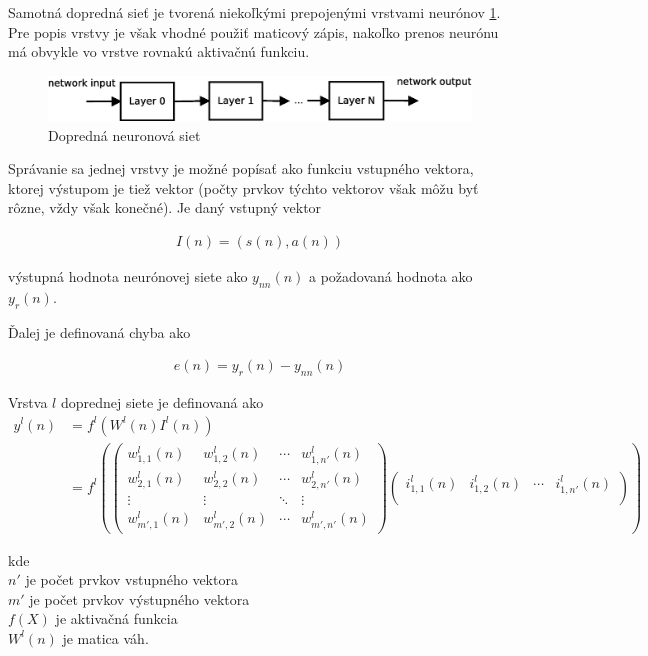 Samotná dopredná sieť je tvorená niekoľkými prepojenými vrstvami neurónov \ref{img:ffnn}.
Pre popis vrstvy je však vhodné použiť maticový zápis, nakoľko prenos neurónu má
obvykle vo vrstve rovnakú aktivačnú funkciu.

\begin{figure}[!htb]
\center
\includegraphics[scale=.6]{../diagrams/neural_layers.eps}
\caption{Dopredná neuronová siet}
\label{img:ffnn}
\end{figure}

Správanie sa jednej vrstvy je možné popísať ako funkciu vstupného vektora,
ktorej výstupom je tiež vektor (počty prvkov týchto vektorov však môžu byť rôzne,
vždy však konečné).
Je daný vstupný vektor

\begin{align}
I(n) = (s(n), a(n))
\label{eq:nn_input_vector}
\end{align}

výstupná hodnota neurónovej siete ako $y_{nn}(n)$ a požadovaná hodnota ako $y_{r}(n)$.

Ďalej je definovaná chyba ako

\begin{align}
e(n) = y_{r}(n) - y_{nn}(n)
\label{eq:nn_error}
\end{align}

Vrstva $l$ doprednej siete je definovaná ako
\begin{align}
y^l(n) &= f^l\left(W^l(n)I^l(n)\right) \nonumber \\
 &= f^l\left(
 \begin{pmatrix}
  w^l_{1,1}(n) & w^l_{1,2}(n) & \cdots & w^l_{1,n'}(n) \\
  w^l_{2,1}(n) & w^l_{2,2}(n) & \cdots & w^l_{2,n'}(n) \\
  \vdots  & \vdots  & \ddots & \vdots  \\
  w^l_{m',1}(n)  & w^l_{m',2}(n)  & \cdots & w^l_{m',n'}(n)
 \end{pmatrix}
 \begin{pmatrix}
  i^l_{1,1}(n) & i^l_{1,2}(n) & \cdots & i^l_{1,n'}(n) \\
 \end{pmatrix}
 \right)
 \label{eq:nn_layer}
\end{align}

kde \\
$n'$ je počet prvkov vstupného vektora \\
$m'$ je počet prvkov výstupného vektora \\
$f(X)$ je aktivačná funkcia \\
$W^l(n)$ je matica váh.

